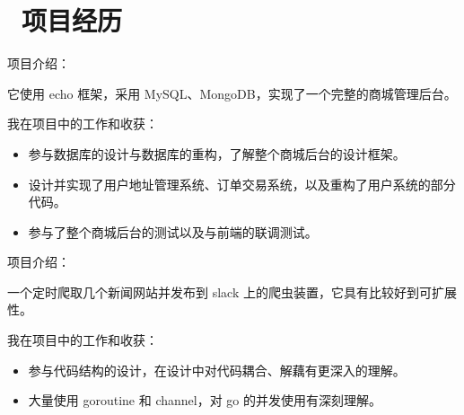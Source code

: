 \documentclass{resume}
\begin{document}
\section{\faUsers\ 项目经历} \vspace{1mm}
\faLink {}

\vspace{1mm} \par
\noindent
项目介绍：

\vspace{1mm}\par
\setlength{\parindent}{2ex}
它使用 echo 框架，采用 MySQL、MongoDB，实现了一个完整的商城管理后台。

\vspace{1mm}\par
\noindent
我在项目中的工作和收获：

\begin{itemize}[parsep=1ex]
	\item 参与数据库的设计与数据库的重构，了解整个商城后台的设计框架。
	\item 设计并实现了用户地址管理系统、订单交易系统，以及重构了用户系统的部分代码。
	\item 参与了整个商城后台的测试以及与前端的联调测试。
\end{itemize} \vspace{1mm}


\vspace{1mm}\par
\noindent
项目介绍：

\vspace{1mm}\par
\setlength{\parindent}{2ex}
一个定时爬取几个新闻网站并发布到 slack 上的爬虫装置，它具有比较好到可扩展性。

\vspace{1mm}\par
\noindent
我在项目中的工作和收获：

\begin{itemize}[parsep=1ex]
	\item 参与代码结构的设计，在设计中对代码耦合、解藕有更深入的理解。
	\item 大量使用 goroutine 和 channel，对 go 的并发使用有深刻理解。
\end{itemize}
\end{document}
